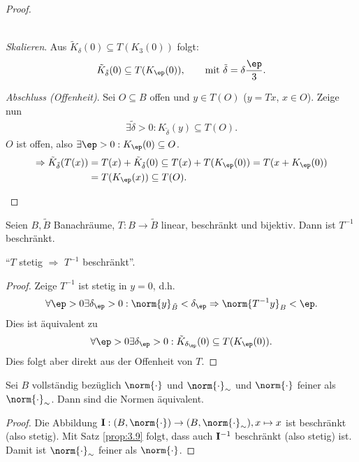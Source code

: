 \begin{proof}
\begin{proofenum}
\begin{align*}
\end{align*}
\item \textit{Skalieren}. Aus $\tilde{K}_\delta(0)\subseteq T(K_3(0))$ folgt:
\begin{align*}
\tilde{K}_{\tilde{\delta}}(0) \subseteq T(K_\ep(0)),\qquad
\text{mit } \tilde{\delta} = \delta\frac{\ep}{3}.
\end{align*}
\item \textit{Abschluss (Offenheit)}. Sei $O\subseteq B$ offen und $y\in
T(O)$ ($y=Tx$, $x\in O$). Zeige nun
\begin{align*}
\exists \tilde{\delta} > 0 : K_{\tilde{\delta}}(y) \subseteq T(O).
\end{align*}
$O$ ist offen, also $\exists \ep > 0 : K_\ep(0)\subseteq O$.
\begin{align*}
\Rightarrow
\tilde{K}_{\tilde{\delta}}(T(x)) &= T(x) + \tilde{K}_{\tilde{\delta}}(0)
\subseteq T(x)+T(K_\ep(0)) = T(x+K_\ep(0)) \\ &= T(K_\ep(x)) \subseteq
T(O).\qedhere
\end{align*} 
\end{proofenum}
\end{proof}

\begin{prop}
\label{prop:3.9}
Seien $B,\tilde{B}$ Banachräume, $T:B\to\tilde{B}$ linear, beschränkt und
bijektiv. Dann ist $T^{-1}$ beschränkt.\fishhere
\end{prop}

``$T$ stetig $\Rightarrow$ $T^{-1}$ beschränkt''.

\begin{proof}
Zeige $T^{-1}$ ist stetig in $y=0$, d.h.
\begin{align*}
\forall \ep > 0 \exists \delta_\ep > 0 : \norm{y}_{\tilde{B}} < \delta_\ep
\Rightarrow \norm{T^{-1}y}_B < \ep.
\end{align*}
Dies ist äquivalent zu
\begin{align*}
\forall \ep > 0 \exists \delta_\ep > 0 : \tilde{K}_{\delta_\ep}(0)\subseteq
T(K_\ep(0)).
\end{align*}
Dies folgt aber direkt aus der Offenheit von $T$.\qedhere
\end{proof}

\begin{cor}
\label{prop:3.10}
Sei $B$ vollständig bezüglich $\norm{\cdot}$ und $\norm{\cdot}_\sim$ und
$\norm{\cdot}$ feiner als $\norm{\cdot}_\sim$. Dann sind die Normen
äquivalent.\qedhere
\end{cor}
\begin{proof}
Die Abbildung $\Id : (B,\norm{\cdot}) \to (B,\norm{\cdot}_\sim), x\mapsto x$
ist beschränkt (also stetig). Mit Satz \ref{prop:3.9} folgt, dass auch
$\mathbf{I}^{-1}$ beschränkt (also stetig) ist. Damit ist $\norm{\cdot}_\sim$ feiner als
$\norm{\cdot}$.\qedhere
\end{proof}
